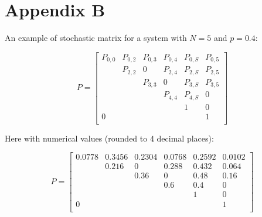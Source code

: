 \section*{Appendix B}

An example of stochastic matrix for a system with $N=5$ and $p = 0.4$:


\begin{equation*}
P = 
\begin{bmatrix}
P_{0,0}	& P_{0,2}	& P_{0,3}  	& P_{0, 4}	& P_{0,S}	& P_{0,5} \\
		& P_{2,2}	& 0  		& P_{2, 4}	& P_{2,S}	& P_{2,5} \\
		& 			& P_{3,3}	& 0			& P_{3,S}	& P_{3,5} \\
		& 			& 			& P_{4,4}	& P_{4,S}	& 0\\
		& 			& 			& 			& 1			& 0\\
0		& 			& 		  	& 			& 			& 1\\
\end{bmatrix}
\label{exampleMatrix}
\end{equation*}

\hfill \break

Here with numerical values (rounded to 4 decimal places):

\begin{equation*}
P = 
\begin{bmatrix}
0.0778	& 0.3456	& 0.2304  	& 0.0768	& 0.2592	& 0.0102 \\
		& 0.216		& 0  		&0.288		& 0.432		& 0.064 \\
		& 			& 0.36		& 0			& 0.48		& 0.16 \\
		& 			& 			& 0.6		& 0.4		& 0\\
		& 			& 			& 			& 1			& 0\\
0		& 			& 		  	& 			& 			& 1\\
\end{bmatrix}
\label{exampleMatrixValues}
\end{equation*}

\hfill \break

